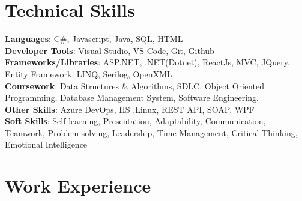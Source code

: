 \documentclass[a4paper,12pt]{article}
\begin{document}
\section{\textbf{Technical Skills}}
 \begin{itemize}[leftmargin=0.1in, label={}]
    \small{\item{
     \textbf{Languages}{: C\#, Javascript, Java, SQL, HTML} \\
     \textbf{Developer Tools}{: Visual Studio, VS Code, Git, Github } \\
     \textbf{Frameworks/Libraries}{: ASP.NET, .NET(Dotnet), ReactJs, MVC, JQuery, Entity Framework, LINQ, Serilog, OpenXML } \\
     \textbf{Coursework}{: Data Structures \& Algorithms, SDLC, Object Oriented Programming, Database Management System, Software Engineering.} \\
     \textbf{Other Skills}{: Azure DevOps, IIS ,Linux, REST API, SOAP, WPF} \\
     \textbf{Soft Skills}{: Self-learning, Presentation, Adaptability, Communication, Teamwork, Problem-solving, Leadership, Time Management, Critical Thinking, Emotional Intelligence} \\
    }}
 \end{itemize}

\section{Work Experience}
\end{document}
